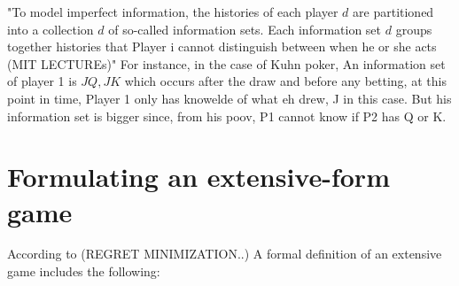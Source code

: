 \documentclass{article}
\begin{document}
"To model imperfect information, the histories of each player $d$ are partitioned into a collection $d$
of so-called information sets. Each information set $d$
 groups together histories that Player i cannot
distinguish between when he or she acts  (MIT LECTUREs)" For instance, in the case of Kuhn poker, An information set of player 1 is ${JQ, JK}$ which occurs after the draw and before any betting, at this point in time, Player 1 only has knowelde of what eh drew, J in this case. But his information set is bigger since, from his poov, P1 cannot know if P2 has Q or K. 





\section{Formulating an extensive-form game}
According to (REGRET MINIMIZATION..)
A formal definition of an extensive game includes the following:
\end{document}
